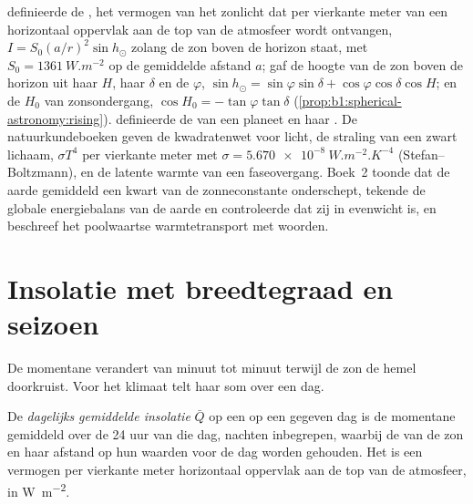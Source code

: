 \begin{recall}
 definieerde de , het vermogen van het zonlicht dat per vierkante meter van een horizontaal oppervlak aan de top van de atmosfeer wordt ontvangen, $I = S_0(a/r)^2\sin h_\odot$ zolang de zon boven de horizon staat, met $S_0 = \qty{1361}{W.m^{-2}}$ op de gemiddelde afstand $a$; gaf de hoogte van de zon boven de horizon uit haar  $H$, haar  $\delta$ en de  $\varphi$, $\sin h_\odot = \sin\varphi\sin\delta + \cos\varphi\cos\delta\cos H$; en de  $H_0$ van zonsondergang, $\cos H_0 = -\tan\varphi\tan\delta$ (\cref{prop:b1:spherical-astronomy:rising}).  definieerde de  van een planeet en haar . De natuurkundeboeken geven de kwadratenwet voor licht, de straling van een zwart lichaam, $\sigma T^4$ per vierkante meter met $\sigma = \qty{5.670e-8}{W.m^{-2}.K^{-4}}$ (Stefan--Boltzmann), en de latente warmte van een faseovergang. Boek~2 toonde dat de aarde gemiddeld een kwart van de zonneconstante onderschept, tekende de globale energiebalans van de aarde en controleerde dat zij in evenwicht is, en beschreef het poolwaartse warmtetransport met woorden.
\end{recall}

\section{Insolatie met breedtegraad en seizoen}\label{sec:b1:radiation-heat-transport:insolation}

De momentane  verandert van minuut tot minuut terwijl de zon de hemel doorkruist. Voor het klimaat telt haar som over een dag.

\begin{definition}\label{def:b1:radiation-heat-transport:daily-insolation}
De \emph{dagelijks gemiddelde insolatie} $\bar Q$ op een  op een gegeven dag is de momentane  gemiddeld over de 24 uur van die dag, nachten inbegrepen, waarbij de  van de zon en haar afstand op hun waarden voor de dag worden gehouden. Het is een vermogen per vierkante meter horizontaal oppervlak aan de top van de atmosfeer, in \unit{W.m^{-2}}.
\end{definition}


